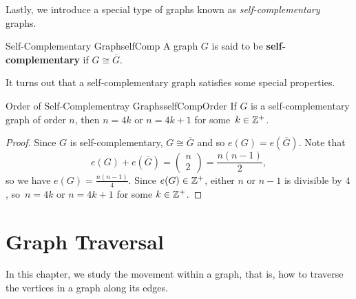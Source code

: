 \documentclass[math]{amznotes}
\theoremstyle{remark}
\begin{document}
Lastly, we introduce a special type of graphs known as \textit{self-complementary} graphs.
\begin{dfnbox}{Self-Complementary Graph}{selfComp}
    A graph $G$ is said to be {\color{red} \textbf{self-complementary}} if $G \cong \overline{G}$.
\end{dfnbox}
It turns out that a self-complementary graph satisfies some special properties.
\begin{probox}{Order of Self-Complementray Graphs}{selfCompOrder}
    If $G$ is a self-complementary graph of order $n$, then $n = 4k$ or $n = 4k + 1$ for some~$k \in \mathbb{Z}^+$.
    \tcblower
    \begin{proof}
        Since $G$ is self-complementary, $G \cong \overline{G}$ and so $e(G) = e\left(\overline{G}\right)$. Note that
        \begin{equation*}
            e(G) + e\left(\overline{G}\right) = \begin{pmatrix}
                n \\
                2
            \end{pmatrix} = \frac{n(n - 1)}{2},
        \end{equation*}
        so we have $e(G) = \frac{n(n - 1)}{4}$. Since $e(G) \in \mathbb{Z}^+$, either $n$ or $n - 1$ is divisible by $4$, so~$n = 4k$ or $n = 4k + 1$ for some $k \in \mathbb{Z}^+$.
    \end{proof}
\end{probox}
\section{Graph Traversal}
In this chapter, we study the movement within a graph, that is, how to traverse the vertices in a graph along its edges.
\end{document}
